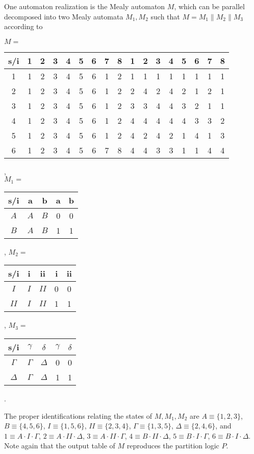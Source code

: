 One automaton realization is the Mealy automaton $M$, which can be
parallel decomposed into two Mealy automata $M_1, M_2$ such that
$M=M_1 \| M_2 \| M_3$ according to
\begin{center}
$M=$
\begin{tabular}{|c|cccccccc||cccccccc|}
 \hline
s/i &1&2&3&4&5&6&7&8 & 1&2&3&4&5&6&7&8 \\
 \hline
1&1&2&3&4&5&6&1&2 & 1&1&1&1&1&1&1&1\\
2&1&2&3&4&5&6&1&2 & 2&4&2&4&2&1&2&1\\
3&1&2&3&4&5&6&1&2 & 3&3&4&4&3&2&1&1\\
4&1&2&3&4&5&6&1&2 & 4&4&4&4&4&3&3&2\\
5&1&2&3&4&5&6&1&2 & 4&2&4&2&1&4&1&3\\
6&1&2&3&4&5&6&7&8 & 4&4&3&3&1&1&4&4\\
 \hline
\end{tabular}
,\\
$\,$\\
$M_1=$
\begin{tabular}{|c|cc||cc|}
 \hline
s/i &a&b & a&b\\
 \hline
$A$&$A$&$B$ & 0&0\\
$B$&$A$&$B$ & 1&1\\
 \hline
\end{tabular}
,
$M_2=$
\begin{tabular}{|c|cc||cc|}
 \hline
s/i &i&ii& i&ii\\
 \hline
$I$&$I$&$II$ & 0&0\\
$II$&$I$&$II$ & 1&1\\
 \hline
\end{tabular}
,
$M_3=$
\begin{tabular}{|c|cc||cc|}
 \hline
s/i &$\gamma$&$\delta$&$\gamma$&$\delta$ \\
 \hline
$\Gamma$&$\Gamma$&$\Delta $ & 0&0\\
$\Delta$&$\Gamma $&$\Delta $ & 1&1\\
 \hline
\end{tabular}
.
\end{center}
The proper identifications relating the states of $M,M_1,M_2$ are
$A\equiv \{1,2,3\}$,
$B\equiv \{4,5,6\}$,
$I\equiv \{1,5,6\}$,
$II\equiv \{2,3,4\}$,
$\Gamma \equiv \{1,3,5\}$,
$\Delta \equiv \{2,4,6\}$,
 and
$1\equiv A\cdot I\cdot \Gamma $,
$2\equiv A\cdot II\cdot \Delta $,
$3\equiv A\cdot II\cdot \Gamma $,
$4\equiv B\cdot II\cdot  \Delta $,
$5\equiv B\cdot I\cdot  \Gamma $,
$6\equiv B\cdot I\cdot  \Delta $.
Note again that the output table of $M$ reproduces the partition logic
$P$.

